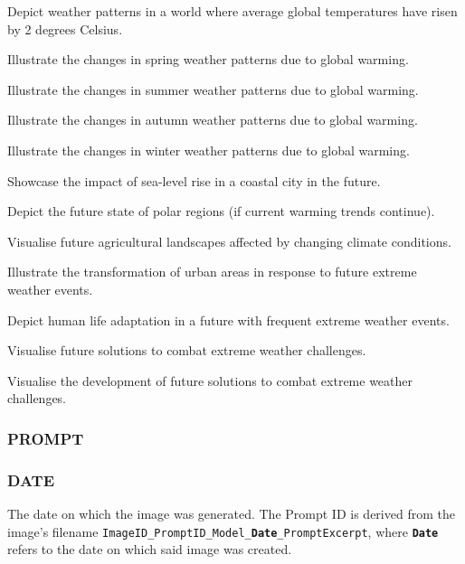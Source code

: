 \begin{description}[leftmargin=2.5cm, style = multiline, labelwidth=1.5cm]
\item[20] Depict weather patterns in a world where average global temperatures have risen by 2 degrees Celsius.

\item[21] Illustrate the changes in spring weather patterns due to global warming.

\item[22] Illustrate the changes in summer weather patterns due to global warming.

\item[23] Illustrate the changes in autumn weather patterns due to global warming.

\item[24] Illustrate the changes in winter weather patterns due to global warming.

\item[25] Showcase the impact of sea-level rise in a coastal city in the future.

\item[26] Depict the future state of polar regions (if current warming trends continue).

\item[27] Visualise future agricultural landscapes affected by changing climate conditions.
\item[28] Illustrate the transformation of urban areas in response to future extreme weather events.
\item[29] Depict human life adaptation in a future with frequent extreme weather events.
\item[30] Visualise future solutions to combat extreme weather challenges.
\item[31] Visualise the development of future solutions to combat extreme weather challenges.

\end{description}

\subsubsection*{PROMPT}

 \subsubsection*{DATE} 

The date on which the image was generated. The Prompt ID is derived from the image's filename \texttt{ImageID\_PromptID\_Model\_\textbf{Date}\_PromptExcerpt}, where \texttt{\textbf{Date}} refers to the date on which said image was created.

